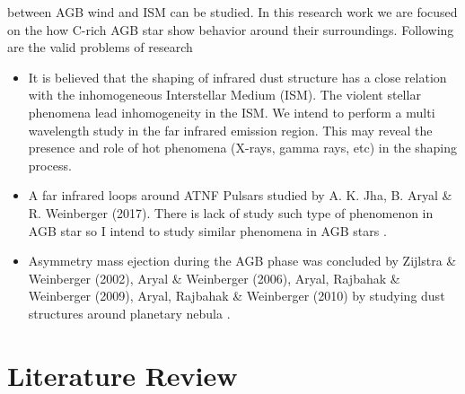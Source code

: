 \documentclass[fleqn,a4paper,12pt,oneside]{article}
\begin{document}
between AGB wind and ISM can be studied. In this research work we
are focused on the how C-rich AGB star show behavior around their
surroundings.
Following are the valid problems of research
\begin{itemize}
	\item  It is believed that the shaping of infrared dust structure
has a close relation with the inhomogeneous Interstellar Medium
(ISM). The violent stellar phenomena lead inhomogeneity in the
ISM. We intend to perform a multi wavelength study in the
far infrared emission region. This may reveal the presence and
role of hot phenomena (X-rays, gamma rays, etc) in the shaping
process. \item  A  far infrared loops around ATNF Pulsars studied by A. K. Jha,  B. Aryal \& R. Weinberger (2017). There is lack of study such type of phenomenon in AGB star so I intend to study similar phenomena in AGB stars \cite{akj}.  
\item Asymmetry mass ejection during the AGB phase was concluded
by Zijlstra \& Weinberger (2002), Aryal \& Weinberger (2006), Aryal, Rajbahak \& Weinberger
(2009), Aryal, Rajbahak \& Weinberger (2010) by studying dust
structures around planetary nebula \cite{B_1,B_2,B_4}.
\end{itemize}



\section{Literature Review}
\end{document}
